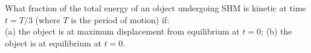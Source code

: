 What fraction of the total energy of an object undergoing SHM is
kinetic at time $t=T/3$ (where $T$ is the period of motion) if:\\
%
(a) the object is at maximum displacement from equilibrium at $t=0$;\answercheck\hwendpart
%
(b) the object is at equilibrium at $t=0$.\answercheck
